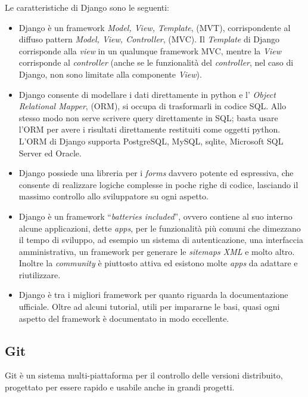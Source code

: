 Le caratteristiche di Django sono le seguenti:
\begin{itemize}
\item Django è un framework \emph{Model, View, Template}, (MVT),
  corrispondente al diffuso pattern \emph{Model, View, Controller},
  (MVC). Il \emph{Template} di Django corrisponde alla \emph{view} in
  un qualunque framework MVC, mentre la \emph{View} corrisponde al
  \emph{controller} (anche se le funzionalità del \emph{controller},
  nel caso di Django, non sono limitate alla componente \emph{View}).
\item Django consente di modellare i dati direttamente in python e l'
  \emph{Object Relational Mapper}, (ORM), si occupa di trasformarli in
  codice SQL. Allo stesso modo non serve scrivere query direttamente
  in SQL; basta usare l'ORM per avere i risultati direttamente
  restituiti come oggetti python. L'ORM di Django supporta PostgreSQL,
  MySQL, sqlite, Microsoft SQL Server ed Oracle.
\item Django possiede una libreria per i \emph{forms} davvero potente ed
  espressiva, che consente di realizzare logiche complesse in poche
  righe di codice, lasciando il massimo controllo allo sviluppatore su
  ogni aspetto.
\item Django è un framework ``\emph{batteries included}'', ovvero
  contiene al suo interno alcune applicazioni, dette \emph{apps}, per
  le funzionalità più comuni che dimezzano il tempo di sviluppo, ad
  esempio un sistema di autenticazione, una interfaccia
  amministrativa, un framework per generare le \emph{sitemaps XML} e
  molto altro. Inoltre la \emph{community} è piuttosto attiva ed
  esistono molte \emph{apps} da adattare e riutilizzare.
\item Django è tra i migliori framework per quanto riguarda la
  documentazione ufficiale. Oltre ad alcuni tutorial, utili per
  impararne le basi, quasi ogni aspetto del framework è documentato in
  modo eccellente.
\end{itemize}

\subsection{Git}\label{sec:GIT}
Git è un sistema multi-piattaforma per il controllo delle versioni
distribuito, progettato per essere rapido e usabile anche in grandi
progetti.

